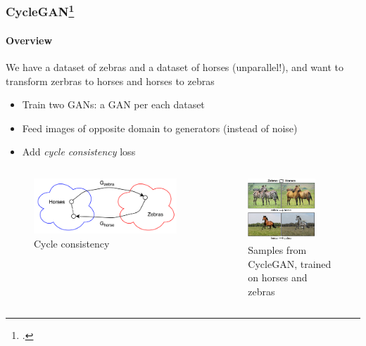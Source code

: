 \documentclass[10pt]{beamer}
\begin{document}
\begin{frame}
\frametitle{CycleGAN\footcite{CycleGAN}}
\framesubtitle{Overview}
We have a dataset of zebras and a dataset of horses (unparallel!), and want to transform zerbras to horses and horses to zebras
\begin{itemize}
    \item Train two GANs: a GAN per each dataset
    \item Feed images of opposite domain to generators (instead of noise)
    \item Add \textit{cycle consistency} loss
\end{itemize}


\begin{columns}[T] %
\begin{column}[T]{5cm}
\begin{figure}
    \vspace{1cm}
    \centering
    \includegraphics[width=\textwidth]{images/cycle-gan-cycle-consistency}
    \caption{Cycle consistency}
\end{figure}
\end{column}
\begin{column}[T]{5cm}
\begin{figure}
    \centering
    \includegraphics[width=0.8\textwidth]{images/cycle-gan-horses}
    \caption{Samples from CycleGAN, trained on horses and zebras}
\end{figure}
\end{column}
\end{columns}
\end{frame}
\end{document}
